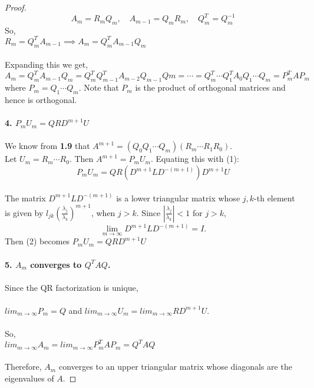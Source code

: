 \documentclass[12pt]{article}
\begin{document}
\begin{proof}
        \[ 
            A_{m} = R_mQ_m, \quad A_{m-1}=Q_mR_m, \quad Q_m^T = Q_m^{-1} 
        \]
        So, \\
        $ R_m = Q_m^TA_{m-1} \implies A_{m} = Q^T_mA_{m-1}Q_m$\\ \\
        Expanding this we get, \\
        \[
            A_m = Q^T_mA_{m-1}Q_m = Q^T_m Q^T_{m-1} A_{m-2} Q_{m-1} Qm = \cdots = Q^T_m \cdots Q^T_1A_0Q_1 \cdots Q_m = P^T_mAP_m
        \]
        where $P_m = Q_1 \cdots Q_m$. Note that $P_m$ is the product of orthogonal matrices and hence is
        orthogonal. \\\\
        \textbf{4. $P_{m}U_{m} = QR D^{m+1}U$} \\ \\
        We know from \textbf{1.9} that $A^{m+1} = (Q_0 Q_1 \cdots Q_{m}) (R_{m} \cdots R_1 R_0)$. \\
        Let $U_{m} = R_{m} \cdots R_0$. Then $A^{m+1} = P_{m}U_{m}$. Equating this with (1): \\
        \[ P_{m}U_{m} = QR (D^{m+1} L D^{-(m+1)})D^{m+1}U \tag{2} \] \\        
        The matrix \( D^{m+1} L D^{-(m+1)} \) is a lower triangular matrix whose \( j,k \)-th element is given by \( l_{jk} \left( \frac{\lambda_j}{\lambda_k} \right)^{m+1} \), when \( j > k \). Since \( \left| \frac{\lambda_j}{\lambda_k} \right| < 1 \) for \( j > k \),
        \[
        \lim_{m \to \infty} D^{m+1} L D^{-(m+1)} = I.
        \]
        Then (2) becomes $P_{m}U_{m} = QRD^{m+1}U$ \\ \\
        \textbf{5. $A_m$ converges to $Q^TAQ$.} \\ \\
        Since the QR factorization is unique, \\\\
        $lim_{m \to \infty}P_{m} = Q$ and $lim_{m \to \infty}U_{m} = lim_{m \to \infty}RD^{m+1}U$. \\\\
        So,\\
        $lim_{m \to \infty}A_{m} = lim_{m \to \infty}P_{m}^TAP_{m} = Q^TAQ$\\\\
        Therefore, $A_m$ converges to an upper triangular matrix whose diagonals are the eigenvalues of $A$.
    \end{proof}
\end{document}
